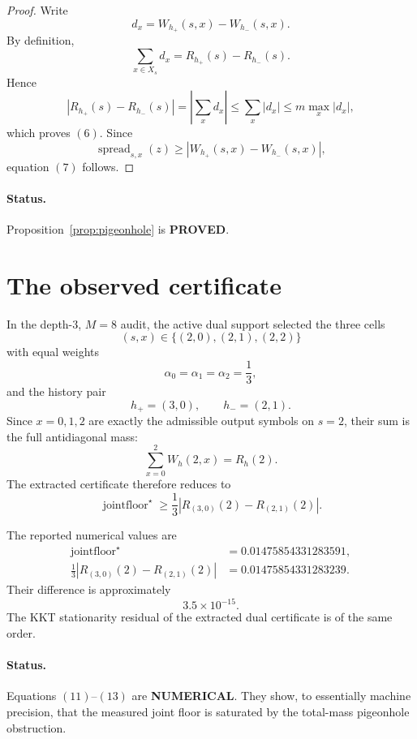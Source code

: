 \documentclass[11pt,a4paper]{article}
\newcommand{\spread}{\operatorname{spread}}
\newcommand{\jointfloor}{\operatorname{jointfloor}}
\newcommand{\PROVED}{\textcolor{green!45!black}{\textbf{PROVED}}}
\newcommand{\NUM}{\textcolor{blue!70!black}{\textbf{NUMERICAL}}}
\begin{document}
\begin{proof}
Write
\[
d_x
=
W_{h_+}(s,x)-W_{h_-}(s,x).
\]
By definition,
\[
\sum_{x\in X_s} d_x
=
R_{h_+}(s)-R_{h_-}(s).
\]
Hence
\[
\left|R_{h_+}(s)-R_{h_-}(s)\right|
=
\left|\sum_x d_x\right|
\le
\sum_x |d_x|
\le
m\max_x |d_x|,
\]
which proves \((6)\).  Since
\[
\spread_{s,x}(z)
\ge
\left|
W_{h_+}(s,x)-W_{h_-}(s,x)
\right|,
\]
equation \((7)\) follows.
\end{proof}

\paragraph{Status.}
Proposition~\ref{prop:pigeonhole} is \PROVED.

\section{The observed certificate}

In the depth-\(3\), \(M=8\) audit, the active dual support selected the three
cells
\[
(s,x)\in\{(2,0),(2,1),(2,2)\}
\]
with equal weights
\[
\boxed{
\alpha_0=\alpha_1=\alpha_2=\frac13,
}
\tag{8}
\]
and the history pair
\[
\boxed{
h_+=(3,0),
\qquad
h_-=(2,1).
}
\tag{9}
\]
Since \(x=0,1,2\) are exactly the admissible output symbols on \(s=2\), their
sum is the full antidiagonal mass:
\[
\sum_{x=0}^2 W_h(2,x)=R_h(2).
\]
The extracted certificate therefore reduces to
\begin{equation}
\boxed{
\jointfloor^\star
\ge
\frac13
\left|
R_{(3,0)}(2)-R_{(2,1)}(2)
\right|.
}
\tag{10}
\end{equation}

The reported numerical values are
\begin{align}
\jointfloor^\star
&=
0.01475854331283591,
\tag{11}\\
\frac13
\left|
R_{(3,0)}(2)-R_{(2,1)}(2)
\right|
&=
0.01475854331283239.
\tag{12}
\end{align}
Their difference is approximately
\[
\boxed{
3.5\times10^{-15}.
}
\tag{13}
\]
The KKT stationarity residual of the extracted dual certificate is of the
same order.

\paragraph{Status.}
Equations \((11)\)--\((13)\) are \NUM.  They show, to essentially machine
precision, that the measured joint floor is saturated by the total-mass
pigeonhole obstruction.
\end{document}
